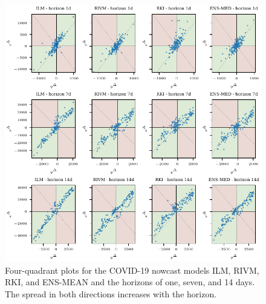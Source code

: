 \documentclass[pdflatex]{sn-jnl}
\theoremstyle{plain}%
\theoremstyle{definition}
\begin{document}
\begin{figure}
\centering
\includegraphics{plots/covid_nowcast/30_4q_plots}
\caption[Four-quadrant plots for the COVID-19 nowcast models ILM, RIVM, RKI, and ENS-MEAN and the horizons of one, seven, and 14 days.]{Four-quadrant plots for the COVID-19 nowcast models ILM, RIVM, RKI, and ENS-MEAN and the horizons of one, seven, and 14 days. The spread in both directions increases with the horizon. }
\label{fig:app-covid-4q}
\end{figure}
\end{document}
